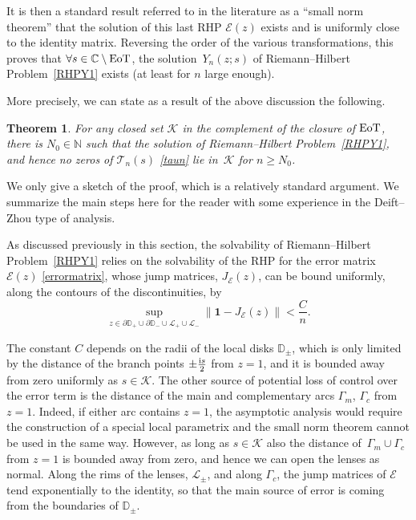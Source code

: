 \documentclass[pdftex]{sigma}
\numberwithin{equation}{section}
\newtheorem{Theorem}{Theorem}[section]
\theoremstyle{definition}
\def \scr{\mathscr}
\def \DD{\mathbb D}
\def\le{\left}
\def\ri{\right}
\def\be{\begin{equation}}
\def\ee{\end{equation}}
\def \1{\mathbf 1}
\def\C{{\mathbb C}}
\def\N{{\mathbb N}}
\def\pa{\partial}
\def\la{\label}
\begin{document}
It is then a standard result referred to in the literature as a ``small norm theorem'' \cite{Deiftbook,DKMVZ} that the solution of this last RHP $\scr E(z)$ exists and is uniformly close to the identity matrix.
Reversing the order of the various transformations, this proves that $\forall s\in \C \setminus {\rm EoT}$, the solution~$Y_n(z;s)$ of Riemann--Hilbert Problem~\ref{RHPY1} exists (at least for $n$ large enough).

More precisely, we can state as a result of the above discussion the following.

\begin{Theorem}\la{theoremnozeros}
For any closed set $\mathcal K$ in the complement of the closure of ${\rm EoT}$, there is $N_0\in \N$ such that the solution of Riemann--Hilbert Problem~{\rm\ref{RHPY1}}, and hence no zeros of $\mathcal T_n(s)$ \eqref{taun} lie in~$\mathcal K$ for $n\geq N_0$.
\end{Theorem}
We only give a sketch of the proof, which is a relatively standard argument. We summarize the main steps here for the reader with some experience in the Deift--Zhou type of analysis.

 As discussed previously in this section, the solvability of Riemann--Hilbert Problem~\ref{RHPY1} relies on the solvability of the RHP for the error matrix $\scr E(z)$ \eqref{errormatrix}, whose jump matrices, $J_{\scr E}(z)$, can be bound uniformly, along the contours of the discontinuities, by
\be
\sup_{z\in \pa\DD_+\cup \pa \DD_- \cup \scr L_+\cup \scr L_-}
\le\|\1 - J_{\scr E}(z)\ri\| < \frac C n.
\label{estim}
\ee

The constant $C$ depends on the radii of the local disks $\DD_\pm$, which is only limited by the distance of the branch points $\pm \frac {{\rm i} s}2$ from $z=1$, and it is bounded away from zero uniformly as $s\in \mathcal K$. The other source of potential loss of control over the error term is the distance of the main and complementary arcs $\Gamma_m$, $\Gamma_c$ from $z=1$. Indeed, if either arc contains $z=1$, the asymptotic analysis would require the construction of a special local parametrix and the small norm theorem cannot be used in the same way. However, as long as $s\in \mathcal K$ also the distance of~${\Gamma_m\cup \Gamma_c}$ from $z=1$ is bounded away from zero, and hence we can open the lenses as normal. Along the rims of the lenses, $ \scr L_\pm$, and along $\Gamma_c$, the jump matrices of $\scr E$ tend exponentially to the identity, so that the main source of error is coming from the boundaries of $\DD_\pm$.
\end{document}
